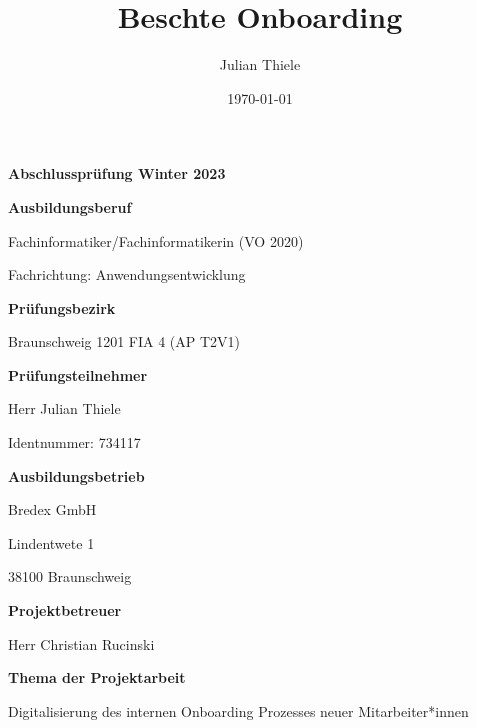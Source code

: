 \documentclass[11pt]{article}
\title{Beschte Onboarding}
\date{\today}
\author{Julian Thiele}
\begin{document}
\sloppy
       
\begin{titlepage}
    \vspace*{\fill}
        \centering
        {\LARGE \textbf{Abschlussprüfung Winter 2023}\par}
        \vspace{1cm}
        {\Large \textbf{Ausbildungsberuf}\par}
        {\Large Fachinformatiker/Fachinformatikerin (VO 2020) \par Fachrichtung: Anwendungsentwicklung\par}
        \vspace{1cm}
        {\Large \textbf{Prüfungsbezirk}\par}
        {\Large Braunschweig 1201 FIA 4 (AP T2V1)\par}
        \vspace{1cm}
        {\Large \textbf{Prüfungsteilnehmer}\par}
        {\Large Herr Julian Thiele\par}
        {\Large Identnummer: 734117\par}
        \vspace{1cm}
        {\Large \textbf{Ausbildungsbetrieb}\par}
        {\Large Bredex GmbH\par}
        {\Large Lindentwete 1\par}
        {\Large 38100 Braunschweig\par}
        \vspace{1cm}
        {\Large \textbf{Projektbetreuer}\par}
        {\Large Herr Christian Rucinski\par}
        \vspace{1cm}
        {\Large \textbf{Thema der Projektarbeit}\par}
        {\Large Digitalisierung des internen Onboarding Prozesses neuer Mitarbeiter*innen\par}

    \vspace*{\fill}   
\end{titlepage}


\tableofcontents
{}
\newpage
{}
\pagestyle{fancy}
                    
\end{document}
